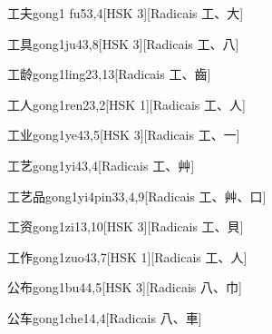 \begin{entry}{工夫}{gong1 fu5}{3,4}[HSK 3][Radicais ⼯、⼤]
\end{entry}

\begin{entry}{工具}{gong1ju4}{3,8}[HSK 3][Radicais ⼯、⼋]
\end{entry}

\begin{entry}{工龄}{gong1ling2}{3,13}[Radicais ⼯、⿒]
\end{entry}

\begin{entry}{工人}{gong1ren2}{3,2}[HSK 1][Radicais ⼯、⼈]
\end{entry}

\begin{entry}{工业}{gong1ye4}{3,5}[HSK 3][Radicais ⼯、⼀]
\end{entry}

\begin{entry}{工艺}{gong1yi4}{3,4}[Radicais ⼯、⾋]
\end{entry}

\begin{entry}{工艺品}{gong1yi4pin3}{3,4,9}[Radicais ⼯、⾋、⼝]
\end{entry}

\begin{entry}{工资}{gong1zi1}{3,10}[HSK 3][Radicais ⼯、⾙]
\end{entry}

\begin{entry}{工作}{gong1zuo4}{3,7}[HSK 1][Radicais ⼯、⼈]
\end{entry}

\begin{entry}{公布}{gong1bu4}{4,5}[HSK 3][Radicais ⼋、⼱]
\end{entry}

\begin{entry}{公车}{gong1che1}{4,4}[Radicais ⼋、⾞]
\end{entry}

